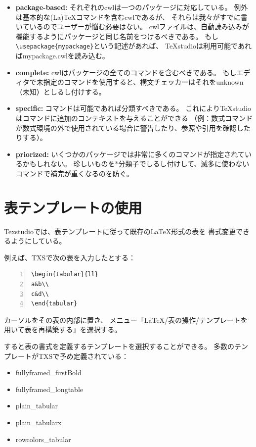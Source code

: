 \begin{itemize}
\item
  \textbf{package-based:}
  それぞれのcwlは一つのパッケージに対応している。
  例外は基本的な(La)TeXコマンドを含むcwlであるが、
  それらは我々がすでに書いているのでユーザーが悩む必要はない。
  cwlファイルは、自動読み込みが機能するようにパッケージと同じ名前をつけるべきである。
  もし\verb+\usepackage{mypackage}+という記述があれば、
  TeXstudioは利用可能であればmypackage.cwlを読み込む。
\item
  \textbf{complete:} cwlはパッケージの全てのコマンドを含むべきである。
  もしエディタで未指定のコマンドを使用すると、構文チェッカーはそれをunknown（未知）としるし付けする。
\item
  \textbf{specific:} コマンドは可能であれば分類すべきである。
  これによりTeXstudioはコマンドに追加のコンテキストを与えることができる
  （例：数式コマンドが数式環境の外で使用されている場合に警告したり、参照や引用を確認したりする）。
\item
  \textbf{priorized:}
  いくつかのパッケージでは非常に多くのコマンドが指定されているかもしれない。
  珍しいものを*分類子でしるし付けして、滅多に使わないコマンドで補完が重くなるのを防ぐ。
\end{itemize}

\section{表テンプレートの使用}

Texstudioでは、表テンプレートに従って既存のLaTeX形式の表を
書式変更できるようにしている。

例えば、TXSで次の表を入力したとする：

\begin{lstlisting}[frame=single,numbers=left]
\begin{tabular}{ll}
a&b\\
c&d\\
\end{tabular}
\end{lstlisting}

カーソルをその表の内部に置き、
メニュー「LaTeX/表の操作/テンプレートを用いて表を再構築する」を選択する。

すると表の書式を定義するテンプレートを選択することができる。
多数のテンプレートがTXSで予め定義されている：

\begin{itemize}
\item
  fullyframed\_firstBold
\item
  fullyframed\_longtable
\item
  plain\_tabular
\item
  plain\_tabularx
\item
  rowcolors\_tabular
\end{itemize}

